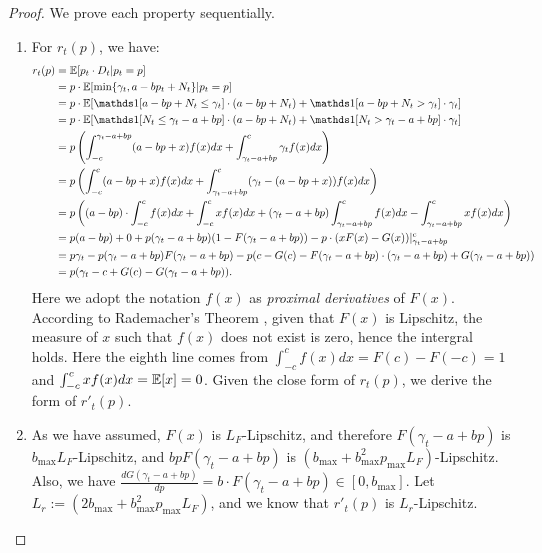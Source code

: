 \begin{proof}
    We prove each property sequentially.
\begin{enumerate}
    \item For $r_t(p)$, we have:
    \begin{equation}
        \label{equ:r_p_calculate}
        \begin{aligned}
            r_t(p)&= \E[p_t\cdot D_t|p_t=p]\\
            &= p\cdot\E[\min\{\gamma_t, a-bp_t+N_t\}|p_t=p]\\
            &=p\cdot\E[\ind[a-bp+N_t\leq\gamma_t]\cdot(a-bp+N_t)+\ind[a-bp+N_t>\gamma_t]\cdot \gamma_t]\\
            &=p\cdot\E[\ind[N_t\leq \gamma_t-a+bp]\cdot(a-bp+N_t) + \ind[N_t >\gamma_t-a+bp]\cdot\gamma_t]\\
            &=p\left(\int_{-c}^{\gamma_t-a+bp}(a-bp+x)f(x)dx + \int_{\gamma_t-a+bp}^c \gamma_t f(x)dx\right)\\
            &=p\left(\int_{-c}^c(a-bp+x)f(x)dx + \int_{\gamma_t-a+bp}^c(\gamma_t-(a-bp+x))f(x)dx\right)\\
            &=p\left((a-bp)\cdot\int_{-c}^cf(x)dx + \int_{-c}^cxf(x)dx+(\gamma_t-a+bp)\int_{\gamma_t-a+bp}^cf(x)dx-\int_{\gamma_t-a+bp}^cxf(x)dx\right)\\
            &=p(a-bp)+0+p(\gamma_t-a+bp)(1-F(\gamma_t-a+bp))-p\cdot(xF(x)-G(x))|_{\gamma_t-a+bp}^c\\
            &=p\gamma_t-p(\gamma_t-a+bp)F(\gamma_t-a+bp)-p(c-G(c)-F(\gamma_t-a+bp)\cdot(\gamma_t-a+bp)+G(\gamma_t-a+bp))\\
            &=p(\gamma_t-c+G(c)-G(\gamma_t-a+bp)).
        \end{aligned}
    \end{equation}
    Here we adopt the notation $f(x)$ as \emph{proximal derivatives} of $F(x)$. According to Rademacher's Theorem \citep[see][Section 3.5]{folland1999real}, given that $F(x)$ is Lipschitz, the measure of $x$ such that $f(x)$ does not exist is zero, hence the intergral holds. Here the eighth line comes from $\int_{-c}^c f(x)dx = F(c) - F(-c) = 1$ and $\int_{-c}^{c}xf(x)dx=\mathbb{E}[x]=0$. Given the close form of $r_t(p)$, we derive the form of $r'_t(p)$.
    \\
    \item As we have assumed, $F(x)$ is $L_F$-Lipschitz, and therefore $F(\gamma_t-a+bp)$ is $b_{\max}L_F$-Lipschitz, and $bpF(\gamma_t-a+bp)$ is $(b_{\max} + b_{\max}^2p_{\max}L_F)$-Lipschitz. Also, we have $\frac{d G(\gamma_t-a+bp)}{dp}=b\cdot F(\gamma_t-a+bp)\in[0, b_{\max}]$. Let $L_r:=(2b_{\max} + b_{\max}^2p_{\max}L_F)$, and we know that $r'_t(p)$ is $L_r$-Lipschitz.

\end{enumerate}
\end{proof}
